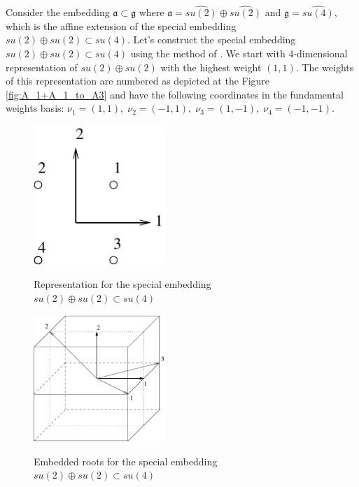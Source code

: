 \documentclass[a4paper,12pt]{article}
\theoremstyle{definition} \newtheorem{Def}{Definition}
\begin{document}
Consider the embedding $\mathfrak{a}\subset \mathfrak{g}$ where $\mathfrak{a}=\widehat{su(2)}\oplus \widehat{su(2)}$ and $\mathfrak{g}= \widehat{su(4)}$, which is the affine extension of the special embedding $su(2)\oplus su(2)\subset su(4)$. Let's construct the special embedding $su(2)\oplus su(2)\subset su(4)$ using the method of \cite{vasilevich1986method}. We start with 4-dimensional representation of $su(2)\oplus su(2)$ with the highest weight $(1,1)$. The weights of this representation are numbered as depicted at the Figure \ref{fig:A_1+A_1_to_A3} and have the following coordinates in the fundamental weights basis: $\nu_1=(1,1),\; \nu_2=(-1,1),\; \nu_3=(1,-1),\; \nu_4=(-1,-1)$.

\begin{figure}[t]
  \begin{multicols}{2}
    \hfill
    \includegraphics[width=50mm]{A_1+A_1_to_A3.pdf}
    \hfill
    \caption{Representation for the special embedding  $su(2)\oplus su(2)\subset su(4)$}
    \label{fig:A_1+A_1_to_A3}
    \hfill
    \includegraphics[width=50mm]{A1+A1-A3.pdf}
    \hfill
    \caption{Embedded roots for the special embedding  $su(2)\oplus su(2)\subset su(4)$}
    \label{fig:A1+A1-A3}
  \end{multicols}
\end{figure}
\end{document}

